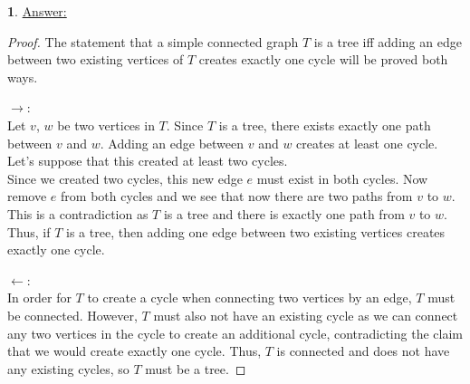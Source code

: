 \documentclass[12pt,a4paper]{article}
\theoremstyle{definition}
\newtheorem{problem}{}
\begin{document}
\begin{problem} \underline{Answer:}
\begin{proof} The statement that a simple connected graph $T$ is a tree iff adding an edge between two existing vertices of $T$ creates exactly one cycle will be proved both ways.

$\rightarrow$: \\
Let $v$, $w$ be two vertices in $T$. Since $T$ is a tree, there exists exactly one path between $v$ and $w$. Adding an edge between $v$ and $w$ creates at least one cycle. Let's suppose that this created at least two cycles. \\

Since we created two cycles, this new edge $e$ must exist in both cycles. Now remove $e$ from both cycles and we see that now there are two paths from $v$ to $w$. This is a contradiction as $T$ is a tree and there is exactly one path from $v$ to $w$. Thus, if $T$ is a tree, then adding one edge between two existing vertices creates exactly one cycle.

$\leftarrow$: \\
In order for $T$ to create a cycle when connecting two vertices by an edge, $T$ must be connected. However, $T$ must also not have an existing cycle as we can connect any two vertices in the cycle to create an additional cycle, contradicting the claim that we would create exactly one cycle. Thus, $T$ is connected and does not have any existing cycles, so $T$ must be a tree.
\end{proof}
\end{problem}
\end{document}
